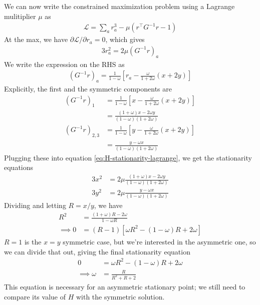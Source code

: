 \documentclass[11pt, reqno]{amsart}
\theoremstyle{notestyle}
\theoremstyle{defstyle}
\begin{document}
We can now write the constrained maximization problem using a Lagrange mulitiplier $\mu$ as
\begin{align*}
    \mathcal{L} = \sum_a r_a^3 - \mu (r^\top G^{-1} r - 1)
\end{align*}
At the max, we have $\partial \mathcal{L} / \partial r_a = 0$, which gives
\begin{align}\label{eq:H-stationarity-lagrange}
    3r_a^2 = 2\mu (G^{-1} r)_a
\end{align}
We write the expression on the RHS as
\begin{align*}
    (G^{-1} r)_a
    = \frac{1}{1-\omega} \left[ r_a - \frac{\omega}{1 + 2\omega} (x + 2y) \right]
\end{align*}
Explicitly, the first and the symmetric components are
\begin{align*}
    (G^{-1} r)_1
    &= \frac{1}{1-\omega} \left[ x - \frac{\omega}{1 + 2\omega} (x + 2y) \right] \\
    &= \frac{(1 + \omega)x - 2\omega y}{(1-\omega)(1 + 2\omega)} \\
    (G^{-1}r)_{2,3}
    &= \frac{1}{1-\omega} \left[ y - \frac{\omega}{1 + 2\omega} (x + 2y) \right] \\
    &= \frac{y - \omega x}{(1-\omega)(1+2\omega)}
\end{align*}
Plugging these into equation \ref{eq:H-stationarity-lagrange}, we get the stationarity equations
\begin{align*}
    3x^2
    &= 2\mu \frac{(1 + \omega)x - 2\omega y}{(1-\omega)(1 + 2\omega)} \\
    3y^2
    &= 2 \mu \frac{y - \omega x}{(1-\omega)(1+2\omega)}
\end{align*}
Dividing and letting $R = x/y$, we have
\begin{align*}
    R^2
    &= \frac{(1+\omega)R - 2\omega}{1 - \omega R} \\
    \implies
    0 &= (R - 1) \left[\omega R^2 - (1 - \omega)R + 2\omega \right]
\end{align*}
$R=1$ is the $x = y$ symmetric case, but we're interested in the asymmetric one, so we can divide that out, giving the final stationarity equation
\begin{align}\label{eq:stationarity}
    0 &= \omega R^2 - (1-\omega)R + 2\omega \\
    \implies
    \omega &= \frac{R}{R^2 + R + 2}
\end{align}
This equation is necessary for an asymmetric stationary point; we still need to compare its value of $H$ with the symmetric solution.
\end{document}
